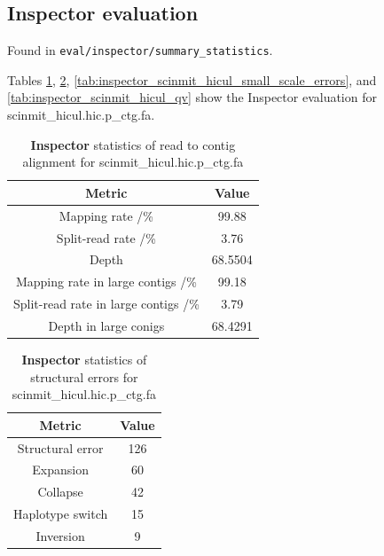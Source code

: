 \documentclass[12pt]{article}
\begin{document}
\subsection{Inspector evaluation}

Found in \texttt{eval/inspector/summary\_statistics}.

Tables \ref{tab:inspector_scinmit_hicul_alignment}, \ref{tab:inspector_scinmit_hicul_structural_errors}, \ref{tab:inspector_scinmit_hicul_small_scale_errors}, and \ref{tab:inspector_scinmit_hicul_qv} show the Inspector evaluation for scinmit\_hicul.hic.p\_ctg.fa.

\begin{table}[h!]
    \begin{center}
    \begin{tabular}{ |c|c| }
        \hline
        Metric & Value \\
        \hline
        Mapping rate /\% & 99.88 \\
        Split-read rate /\% & 3.76 \\
        Depth & 68.5504 \\
        Mapping rate in large contigs /\% & 99.18 \\
        Split-read rate in large contigs /\% & 3.79 \\
        Depth in large conigs & 68.4291 \\
        \hline
    \end{tabular}

    \caption{\textbf{Inspector} statistics of read to contig alignment for scinmit\_hicul.hic.p\_ctg.fa}
    \label{tab:inspector_scinmit_hicul_alignment}
    \end{center}
    \end{table}

\begin{table}[h!]
    \begin{center}
    \begin{tabular}{ |c|c| }
        \hline
        Metric & Value \\
        \hline
        Structural error & 126 \\
        Expansion & 60 \\
        Collapse & 42 \\
        Haplotype switch & 15 \\
        Inversion & 9 \\
        \hline
    \end{tabular}
    \caption{\textbf{Inspector} statistics of structural errors for scinmit\_hicul.hic.p\_ctg.fa}
    \label{tab:inspector_scinmit_hicul_structural_errors}
    \end{center}
    \end{table}
\end{document}
